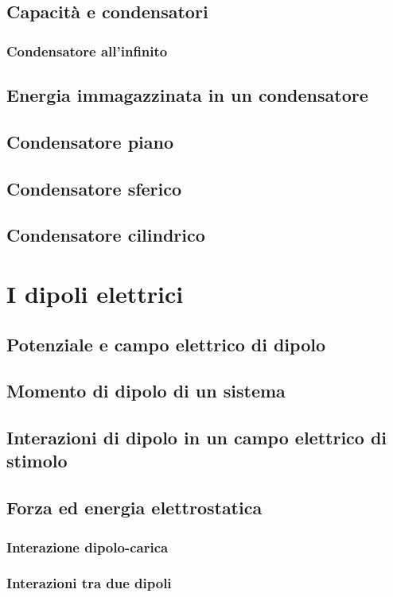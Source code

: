 \documentclass{book}
\begin{document}
\section{Capacit\`a e condensatori}
\subsection{Condensatore all'infinito}
\section{Energia immagazzinata in un condensatore}
\section{Condensatore piano}
\section{Condensatore sferico}
\section{Condensatore cilindrico}

\chapter{I dipoli elettrici}
\section{Potenziale e campo elettrico di dipolo}
\section{Momento di dipolo di un sistema}
\section{Interazioni di dipolo in un campo elettrico di stimolo}
\section{Forza ed energia elettrostatica}
\subsection{Interazione dipolo-carica}
\subsection{Interazioni tra due dipoli}
\end{document}
